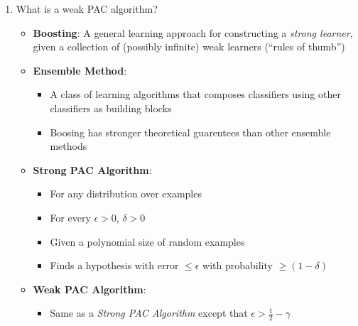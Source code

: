 \documentclass{article}
\newcommand{\abs}[1]{\left| #1\right|}
\renewcommand{\dim}{\mathcal{D}}
\begin{document}
\begin{enumerate}
\begin{itemize}
\begin{align}
m &\geq \frac{1}{2\epsilon^{2}}\left(\ln\abs{H}-\ln(\delta)\right)
\end{align}

\item {\em Generalization Bound}: How much the true error will deviate from the training error.

\begin{align}
\underbrace{err_{\dim}(h)}_{Expected\ Error}-\underbrace{err_{s}(h)}_{Training\ Error} &\leq \sqrt{\frac{\ln\abs{H}-\ln(\delta)}{2m}}\label{eq:ag_prob}
\intertext{which we can use to get an {\em upper bound} on the true error by manipulating Equation~(\ref{eq:ag_prob}), resulting in}
err_{\dim}(h) &\leq \sqrt{\frac{\ln\abs{H}-\ln(\delta)}{2m}} + err_{s}(h)
\end{align}
\end{itemize}


\item What is a weak PAC algorithm?

\begin{itemize}
\item {\bf Boosting}: A general learning approach for constructing a {\em strong learner}, given a collection of (possibly infinite) weak learners (``rules of thumb'')
\item {\bf Ensemble Method}:
\begin{itemize}
\item A class of learning algorithms that composes classifiers using other classifiers as building blocks
\item Boosing has stronger theoretical guarentees than other ensemble methods
\end{itemize}
\item {\bf Strong PAC Algorithm}:
\begin{itemize}
\item For any distribution over examples
\item For every $\epsilon>0$, $\delta>0$
\item Given a polynomial size of random examples
\item Finds a hypothesis with error $\leq \epsilon$ with probability $\geq (1-\delta)$
\end{itemize}
\item {\bf Weak PAC Algorithm}:
\begin{itemize}
\item Same as a {\em Strong PAC Algorithm} except that $\epsilon > \frac{1}{2}-\gamma$
\end{itemize}


\end{itemize}
\end{enumerate}
\end{document}
